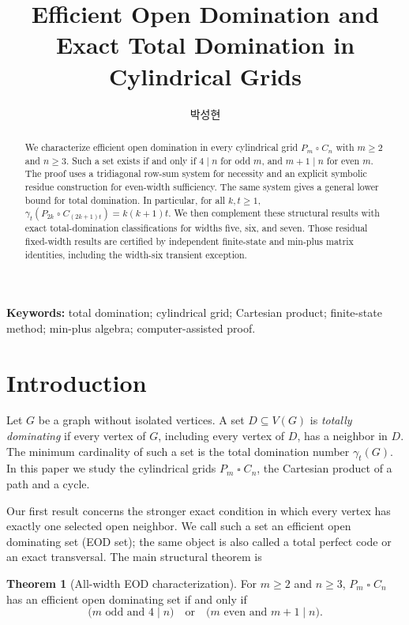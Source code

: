 \documentclass[11pt]{article}
\title{Efficient Open Domination and Exact Total Domination in Cylindrical Grids}
\author{{\koreanfont 박성현}}
\date{}
\theoremstyle{definition}
\newtheorem{theorem}{Theorem}[section]
\newcommand{\gt}{\gamma_t}
\newcommand{\sq}{\mathbin{\square}}
\begin{document}
\maketitle

\begin{abstract}
We characterize efficient open domination in every cylindrical grid
\(P_m\sq C_n\) with \(m\geq2\) and \(n\geq3\). Such a set exists if and only
if \(4\mid n\) for odd \(m\), and \(m+1\mid n\) for even \(m\). The proof
uses a tridiagonal row-sum system for necessity and an explicit symbolic
residue construction for even-width sufficiency. The same system gives a
general lower bound for total domination. In particular, for all \(k,t\geq1\),
\(\gt(P_{2k}\sq C_{(2k+1)t})=k(k+1)t\). We then complement these structural
results with exact total-domination classifications for widths five, six,
and seven. Those residual fixed-width results are certified by independent
finite-state and min-plus matrix identities, including the width-six
transient exception.
\end{abstract}

\noindent\textbf{Keywords:} total domination; cylindrical grid; Cartesian product;
finite-state method; min-plus algebra; computer-assisted proof.

\section{Introduction}

Let \(G\) be a graph without isolated vertices. A set \(D\subseteq V(G)\) is
\emph{totally dominating} if every vertex of \(G\), including every vertex
of \(D\), has a neighbor in \(D\). The minimum cardinality of such a set is
the total domination number \(\gt(G)\). In this paper we study the
cylindrical grids \(P_m\sq C_n\), the Cartesian product of a path and a
cycle.

Our first result concerns the stronger exact condition in which every vertex
has exactly one selected open neighbor. We call such a set an efficient open
dominating set (EOD set); the same object is also called a total perfect code
or an exact transversal. The main structural theorem is

\begin{theorem}[All-width EOD characterization]\label{thm:eod}
For \(m\geq2\) and \(n\geq3\), \(P_m\sq C_n\) has an efficient open
dominating set if and only if
\[
\bigl(m\text{ odd and }4\mid n\bigr)
\quad\text{or}\quad
\bigl(m\text{ even and }m+1\mid n\bigr).
\]
\end{theorem}
\end{document}
